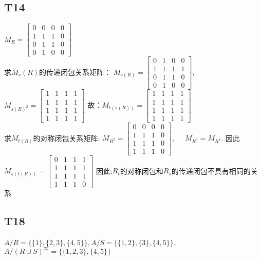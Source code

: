 \documentclass{article}
\begin{document}
\subsection{T14}
$M_R = 
\begin{bmatrix}
    0 & 0 & 0 & 0\\
    1 & 1 & 1 & 0\\
    0 & 1 & 1 & 0\\
    0 & 1 & 0 & 0
\end{bmatrix}$\\
求$M_s{(R)}$的传递闭包关系矩阵：
$M_{s(R)} = 
\begin{bmatrix}
    0 & 1 & 0 & 0\\
    1 & 1 & 1 & 1\\
    0 & 1 & 1 & 0\\
    0 & 1 & 0 & 0
\end{bmatrix}$,
$M_{s(R)^2} = 
\begin{bmatrix}
    1 & 1 & 1 & 1\\
    1 & 1 & 1 & 1\\
    1 & 1 & 1 & 1\\
    1 & 1 & 1 & 1
\end{bmatrix}$
故：$M_{t(s(R))} = 
\begin{bmatrix}
    1 & 1 & 1 & 1\\
    1 & 1 & 1 & 1\\
    1 & 1 & 1 & 1\\
    1 & 1 & 1 & 1
\end{bmatrix}$\\
求$M_{t(R)}$的对称闭包关系矩阵:
$M_{R^2} = 
\begin{bmatrix}
    0 & 0 & 0 & 0\\
    1 & 1 & 1 & 0\\
    1 & 1 & 1 & 0\\
    1 & 1 & 1 & 0
\end{bmatrix}, \quad$
$M_{R^3} = M_{R^2}$.
因此$M_{s(t(R))} = 
\begin{bmatrix}
    0 & 1 & 1 & 1\\
    1 & 1 & 1 & 1\\
    1 & 1 & 1 & 1\\
    1 & 1 & 1 & 0
\end{bmatrix}$
因此:$R_t$的对称闭包和$R_s$的传递闭包不具有相同的关系
\subsection{T18}
$A / R = \{\{1\}, \{2, 3\}, \{4 ,5\}\}, A / S = \{\{1, 2\}, \{3\}, \{4, 5\}\}$.\\
$A / (R \cup S)^\infty = \{\{1, 2, 3\}, \{4, 5\}\}$
\end{document}
